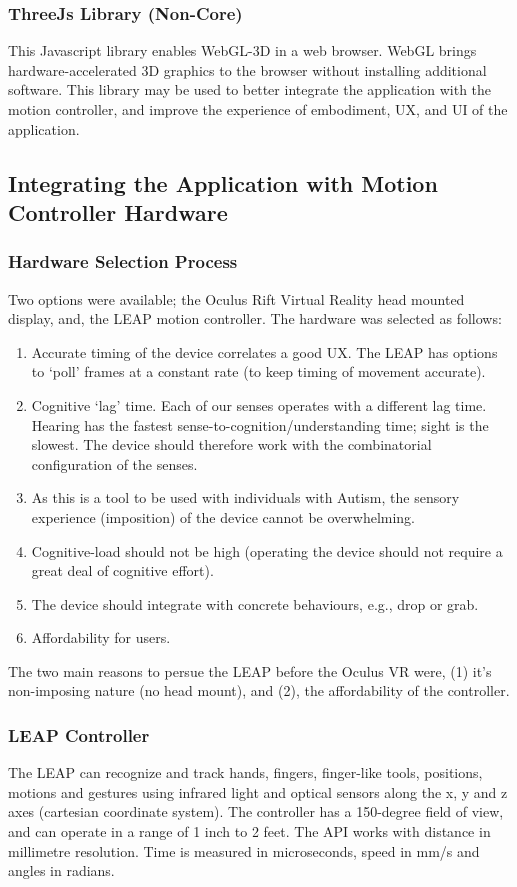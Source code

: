 \documentclass[a4paper, 10pt]{article}
\begin{document}
\subsubsection{ThreeJs Library (Non-Core)}
This Javascript library enables WebGL-3D in a web browser. WebGL brings hardware-accelerated 3D graphics to the browser without installing additional software. This library may be used to better integrate the application with the motion controller, and improve the experience of embodiment, UX, and UI of the application.


\subsection{Integrating the Application with Motion Controller Hardware }\label{hardware}
\subsubsection{Hardware Selection Process}
Two options were available; the Oculus Rift Virtual Reality head mounted display, and, the LEAP motion controller. The hardware was selected as follows: 
\begin{enumerate}
\item Accurate timing of the device correlates a good UX. The LEAP has options to ‘poll’ frames at a constant rate (to keep timing of movement accurate).
\item Cognitive ‘lag’ time. Each of our senses operates with a different lag time. Hearing has the fastest sense-to-cognition/understanding time; sight is the slowest. The device should therefore work with the combinatorial configuration of the senses.
\item As this is a tool to be used with individuals with Autism, the sensory experience (imposition) of the device cannot be overwhelming.
\item Cognitive-load should not be high (operating the device should not require a great deal of cognitive effort).
\item The device should integrate with concrete behaviours, e.g., drop or grab. 
\item Affordability for users.
\end{enumerate}
The two main reasons to persue the LEAP before the Oculus VR were, (1) it's non-imposing nature (no head mount), and (2), the affordability of the controller.

\subsubsection{LEAP Controller}
The LEAP can recognize and track hands, fingers, finger-like tools, positions, motions and gestures using infrared light and optical sensors along the x, y and z axes (cartesian coordinate system). The controller has a 150-degree field of view, and can operate in a range of 1 inch to 2 feet. The API works with distance in millimetre resolution. Time is measured in microseconds, speed in mm/s and angles in radians.
\end{document}
